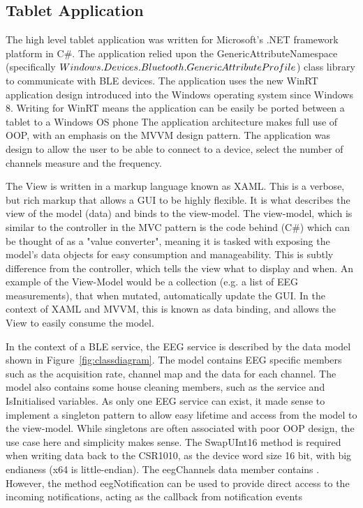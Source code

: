 \documentclass[]{article}
\begin{document}
\subsection{Tablet Application}

The high level tablet application was written for Microsoft's .NET framework platform in C\#. The application relied upon the GenericAttributeNamespace (specifically $Windows.Devices.\\Bluetooth.GenericAttributeProfile$) class library to communicate with \ac{BLE} devices. The application uses the new WinRT application design introduced into the Windows operating system since Windows 8. Writing for WinRT means the application can be easily be ported between a tablet to a Windows OS phone The application architecture makes full use of \ac{OOP}, with an emphasis on the \ac{MVVM} design pattern. The application was design to allow the user to be able to connect to a device, select the number of channels measure and the frequency. 

The View is written in a markup language known as \ac{XAML}. This is a verbose, but rich markup that allows a \ac{GUI} to be highly flexible. It is what describes the view of the model (data) and binds to the view-model. The view-model, which is similar to the controller in the \ac{MVC} pattern is the code behind (C\#) which can be thought of as a "value converter", meaning it is tasked with exposing the model's data objects for easy consumption and manageability. This is subtly difference from the controller, which tells the view what to display and when. An example of the View-Model would be a collection (e.g. a list of \ac{EEG} measurements), that when mutated, automatically update the \ac{GUI}. In the context of \ac{XAML} and \ac{MVVM}, this is known as data binding, and allows the View to easily consume the model.

In the context of a \ac{BLE} service, the \ac{EEG} service is described by the data model shown in Figure~\ref{fig:classdiagram}. The model contains \ac{EEG} specific members such as the acquisition rate, channel map and the data for each channel. The model also contains some house cleaning members, such as the service and IsInitialised variables. As only one \ac{EEG} service can exist, it made sense to implement a singleton pattern to allow easy lifetime and access from the model to the view-model. While singletons are often associated with poor \ac{OOP} design, the use case here and simplicity makes sense. The SwapUInt16 method is required when writing data back to the CSR1010, as the device word size 16 bit, with big endianess (x64 is little-endian). The eegChannels data member contains . However, the method eegNotification can be used to provide direct access to the incoming notifications, acting as the callback from notification events
\end{document}
